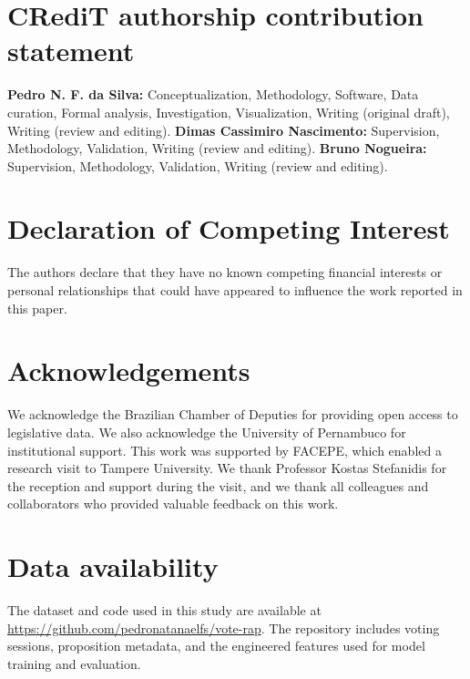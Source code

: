 \documentclass[review]{elsarticle}
\begin{document}
\section*{CRediT authorship contribution statement}
\textbf{Pedro N. F. da Silva:} Conceptualization, Methodology, Software, Data curation, Formal analysis, Investigation, Visualization, Writing (original draft), Writing (review and editing). 
\textbf{Dimas Cassimiro Nascimento:} Supervision, Methodology, Validation, Writing (review and editing). 
\textbf{Bruno Nogueira:} Supervision, Methodology, Validation, Writing (review and editing).

\section*{Declaration of Competing Interest}
The authors declare that they have no known competing financial interests or personal relationships that could have appeared to influence the work reported in this paper.

\section*{Acknowledgements}
We acknowledge the Brazilian Chamber of Deputies for providing open access to legislative data. We also acknowledge the University of Pernambuco for institutional support. This work was supported by FACEPE, which enabled a research visit to Tampere University. We thank Professor Kostas Stefanidis for the reception and support during the visit, and we thank all colleagues and collaborators who provided valuable feedback on this work.


\section*{Data availability}
The dataset and code used in this study are available at \url{https://github.com/pedronatanaelfs/vote-rap}. The repository includes voting sessions, proposition metadata, and the engineered features used for model training and evaluation.



\end{document}
